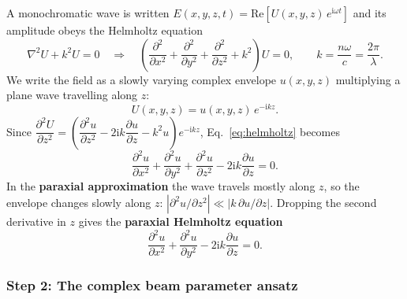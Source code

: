 \documentclass[11pt,a4paper]{article}
\begin{document}
	A monochromatic wave is written $E(x,y,z,t)=\mathrm{Re}\left[U(x,y,z)\,e^{\mathrm{i}\omega t}\right]$ and its amplitude obeys the Helmholtz equation
	\begin{equation}
		\nabla^2U+k^2U=0\quad\Longrightarrow\quad
		\left(\frac{\partial^2}{\partial x^2}+\frac{\partial^2}{\partial y^2}+\frac{\partial^2}{\partial z^2}+k^2\right)U=0,
		\qquad k=\frac{n\omega}{c}=\frac{2\pi}{\lambda}.
		\label{eq:helmholtz}
	\end{equation}
	We write the field as a slowly varying complex envelope $u(x,y,z)$ multiplying a plane wave travelling along $z$:
	\begin{equation}
		U(x,y,z)=u(x,y,z)\,e^{-\mathrm{i}kz}.
	\end{equation}
	Since $\dfrac{\partial^2U}{\partial z^2}=\left(\dfrac{\partial^2u}{\partial z^2}-2\mathrm{i}k\dfrac{\partial u}{\partial z}-k^2u\right)e^{-\mathrm{i}kz}$, Eq.~\eqref{eq:helmholtz} becomes
	\begin{equation}
		\frac{\partial^2u}{\partial x^2}+\frac{\partial^2u}{\partial y^2}+\frac{\partial^2u}{\partial z^2}-2\mathrm{i}k\frac{\partial u}{\partial z}=0 .
	\end{equation}
	In the \textbf{paraxial approximation} the wave travels mostly along $z$, so the envelope changes slowly along $z$: $\left|\partial^2u/\partial z^2\right|\ll\left|k\,\partial u/\partial z\right|$. Dropping the second derivative in $z$ gives the \textbf{paraxial Helmholtz equation}
	\begin{equation}
		\frac{\partial^2u}{\partial x^2}+\frac{\partial^2u}{\partial y^2}-2\mathrm{i}k\frac{\partial u}{\partial z}=0 .
		\label{eq:paraxial}
	\end{equation}
	
	\subsubsection*{Step 2: The complex beam parameter ansatz}
	
\end{document}
